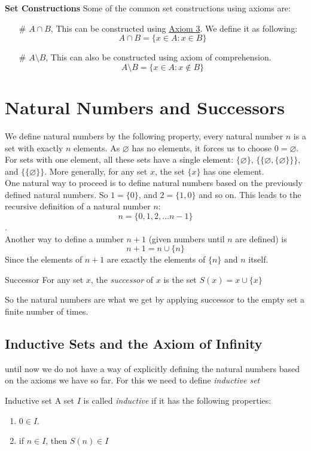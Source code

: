 \documentclass[16pt,a4paper]{article}
\let\emptyset\varnothing
\theoremstyle{definition}
\begin{document}
\textbf{Set Constructions}
Some of the common set constructions using axioms are:
\begin{itemize}
\item[\#] $A\cap B$, This can be constructed using \hyperref[Axiom3]{Axiom 3}. We define it as following: 
\[A\cap B = \{x\in A : x\in B\}\]
\item[\#] $A\setminus B$, This can also be constructed using axiom of comprehension.  
\[A\setminus B = \{x\in A : x \notin B\}\]
\end{itemize}

\newpage
\section{Natural Numbers and Successors}
We define natural numbers by the following property, every natural number $n$ is a set with exactly $n$ elements. As $\varnothing$ has no elements, it forces us to choose $0 = \varnothing$.\\
For sets with one element, all these sets have a single element: $\{\emptyset\}$, $\{\{\emptyset, \{\emptyset\}\}\}$, and $\{\{\emptyset\}\}$. More generally, for any set $x$, the set $\{x\}$ has one element. 
\\
One natural way to proceed is to define natural numbers based on the previously defined natural numbers. So $1 = \{0\}$, and $2 = \{1,0\}$ and so on. This leads to the recursive definition of a natural number $n$:
\[n = \{0,1,2, \ldots n-1\}\].\\
Another way to define a number $n+1$ (given numbers until $n$ are defined) is
\[n+1 = n \cup \{n\}\] 
Since the elements of $n+1$ are exactly the elements of $\{n\}$ and $n$ itself. 

\begin{defn}{Successor}{}
For any set $x$, the \textit{successor} of $x$ is the set $S(x) = x\cup \{x\}$
\end{defn}
So the natural numbers are what we get by applying successor to the empty set a finite number of times. 
\subsection{Inductive Sets and the Axiom of Infinity}
until now we do not have a way of explicitly defining the natural numbers based on the axioms we have so far. For this we need to define \textit{inductive set}
\begin{defn}{Inductive set}{}
A set $I$ is called \textit{inductive} if it has the following properties:
\begin{enumerate}
\item $0\in I$. 
\item if $n \in I$, then $S(n) \in I$
\end{enumerate}
\end{defn}
\end{document}
